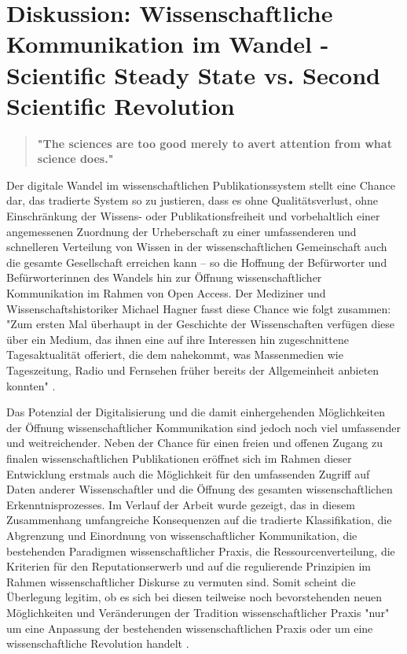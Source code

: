 \chapter{Diskussion: Wissenschaftliche Kommunikation im Wandel - Scientific Steady State vs. Second Scientific Revolution}

\begin{quote}
\textbf{"The sciences are too good merely to avert attention from what science does."}
\end{quote} \cite{Kittler_2004}

Der digitale Wandel im wissenschaftlichen Publikationssystem stellt eine Chance dar, das tradierte System so zu justieren, dass es ohne Qualitätsverlust, ohne Einschränkung der Wissens- oder Publikationsfreiheit und vorbehaltlich einer angemessenen Zuordnung der Urheberschaft zu einer umfassenderen und schnelleren Verteilung von Wissen in der wissenschaftlichen Gemeinschaft auch die gesamte Gesellschaft erreichen kann – so die Hoffnung der Befürworter und Befürworterinnen des Wandels hin zur Öffnung wissenschaftlicher Kommunikation im Rahmen von Open Access. Der Mediziner und Wissenschaftshistoriker Michael Hagner fasst diese Chance wie folgt zusammen: "Zum ersten Mal überhaupt in der Geschichte der Wissenschaften verfügen diese über ein Medium, das ihnen eine auf ihre Interessen hin zugeschnittene Tagesaktualität offeriert, die dem nahekommt, was Massenmedien wie Tageszeitung, Radio und Fernsehen früher bereits der Allgemeinheit anbieten konnten" \cite{Hagner_2015}.

Das Potenzial der Digitalisierung und die damit einhergehenden Möglichkeiten der Öffnung wissenschaftlicher Kommunikation sind jedoch noch viel umfassender und weitreichender. Neben der Chance für einen freien und offenen Zugang zu finalen wissenschaftlichen Publikationen eröffnet sich im Rahmen dieser Entwicklung erstmals auch die Möglichkeit für den umfassenden Zugriff auf Daten anderer Wissenschaftler und die Öffnung des gesamten wissenschaftlichen Erkenntnisprozesses. Im Verlauf der Arbeit wurde gezeigt, das in diesem Zusammenhang umfangreiche Konsequenzen auf die tradierte Klassifikation, die Abgrenzung und Einordnung von wissenschaftlicher Kommunikation, die bestehenden Paradigmen wissenschaftlicher Praxis, die Ressourcenverteilung, die Kriterien für den Reputationserwerb und auf die regulierende Prinzipien im Rahmen wissenschaftlicher Diskurse zu vermuten sind. Somit scheint die Überlegung legitim, ob es sich bei diesen teilweise noch bevorstehenden neuen Möglichkeiten und Veränderungen der Tradition wissenschaftlicher Praxis "nur" um eine Anpassung der bestehenden wissenschaftlichen Praxis oder um eine wissenschaftliche Revolution handelt \cite{Kuhn_2012}.

